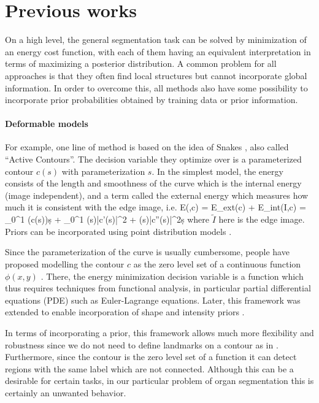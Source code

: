 \documentclass{article} %
\begin{document}
\section{Previous works}
On a high level, the general segmentation task can be solved by minimization of an energy cost function, with each of them having an equivalent interpretation in terms of maximizing a posterior distribution. A common problem for all approaches is that they often find local structures but cannot incorporate global information. In order to overcome this, all methods also have some possibility to incorporate prior probabilities obtained by training data or prior information.

\paragraph{Deformable models}
For example, one line of method is based on the idea of Snakes \cite{Kass88_Snakes, Cootes92_ActiveShape,Cootes01_ActiveApp}, also called ``Active Contours''. The decision variable they optimize over is a parameterized contour $c(s)$ with parameterization $s$. In the simplest model, the energy consists of the length and smoothness of the curve which is the internal energy (image independent), and a term called the external energy which measures how much it is consistent with the edge image, i.e.
\beqs
E(,c) = E_{ext}(c) + E_{int}(I,c) = \int_0^1 (c(s))\d s  + \int_0^1 \alpha(s)|c'(s)|^2 + \beta(s)|c''(s)|^2\d s
\eeqs 
where $\tilde{I}$ here is the edge image. Priors can be incorporated using point distribution models \cite{Cootes92_TrainingShape}. 

Since the parameterization of the curve is usually cumbersome, people have proposed modelling the contour $c$ as the zero level set of a continuous function $\phi(x,y)$ \cite{Leventon00_ShapeGeodesic, ChanVese01, MumfordShah89}. There, the energy minimization decision variable is a function which thus requires techniques from functional analysis, in particular partial differential equations (PDE) such as Euler-Lagrange equations. Later, this framework was extended to enable incorporation of shape and intensity priors \cite{Cremers06_KernelDensity, Chan05_LevelShape, Chen09_LevelShapeIntensity}.

In terms of incorporating a prior, this framework allows much more flexibility and robustness since we do not need to define landmarks on a contour as in \cite{Cootes92_TrainingShape}. Furthermore, since the contour is the zero level set of a function it can detect regions with the same label which are not connected. Although this can be a desirable for certain tasks, in our particular problem of organ segmentation this is certainly an unwanted behavior.
\end{document}
